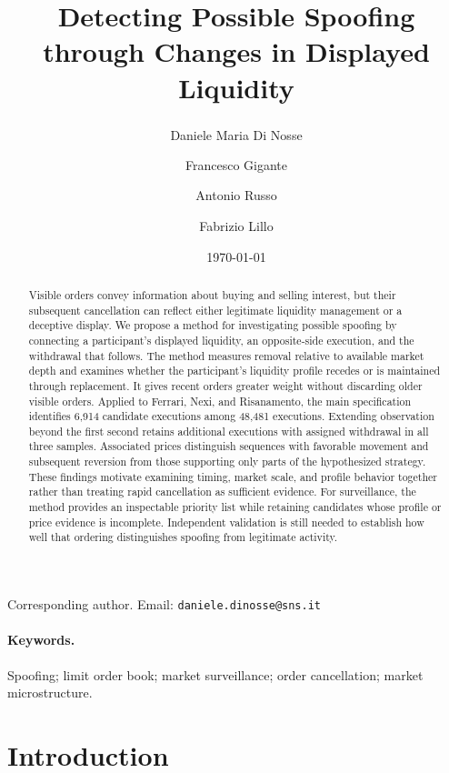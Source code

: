 \documentclass[11pt]{article}
\title{Detecting Possible Spoofing through Changes in Displayed Liquidity}
\author[1]{Daniele Maria Di Nosse\textsuperscript{\dag}}
\author[2]{Francesco Gigante}
\author[2]{Antonio Russo}
\author[1]{Fabrizio Lillo}
\affil[1]{Scuola Normale Superiore, Pisa, Italy}
\affil[2]{Consob, Rome, Italy}
\date{\today}
\newenvironment{review}{\begingroup\color{blue}}{\endgroup}
\begin{document}
\maketitle
\begin{center}
  \footnotesize
  \dag Corresponding author. Email: \texttt{daniele.dinosse@sns.it}
\end{center}

\begin{abstract}
\begin{review}
Visible orders convey information about buying and selling interest, but their subsequent cancellation can reflect either legitimate liquidity management or a deceptive display. We propose a method for investigating possible spoofing by connecting a participant's displayed liquidity, an opposite-side execution, and the withdrawal that follows. The method measures removal relative to available market depth and examines whether the participant's liquidity profile recedes or is maintained through replacement. It gives recent orders greater weight without discarding older visible orders. Applied to Ferrari, Nexi, and Risanamento, the main specification identifies 6,914 candidate executions among 48,481 executions. Extending observation beyond the first second retains additional executions with assigned withdrawal in all three samples. Associated prices distinguish sequences with favorable movement and subsequent reversion from those supporting only parts of the hypothesized strategy. These findings motivate examining timing, market scale, and profile behavior together rather than treating rapid cancellation as sufficient evidence. For surveillance, the method provides an inspectable priority list while retaining candidates whose profile or price evidence is incomplete. Independent validation is still needed to establish how well that ordering distinguishes spoofing from legitimate activity.
\end{review}

\end{abstract}

\paragraph{Keywords.} Spoofing; limit order book; market surveillance; order cancellation; market microstructure.

\section{Introduction}
\label{sec:introduction}
\end{document}
